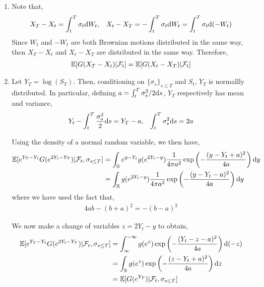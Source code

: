 \begin{solution}[Solution]
\begin{enumerate}[label=(\alph*)]
    \item Note that,
        \begin{align*}
            X_T - X_t = \int_t^T \sigma_t \mathrm{d} W_t
            , && 
            X_t - X_T = -\int_t^T \sigma_t \mathrm{d} W_t = \int_t^T \sigma_t \mathrm{d} (-W_t)
        \end{align*}
        Since \( W_t \) and \( -W_t \) are both Brownian motions distributed in the same way, then \( X_T-X_t \) and \( X_t - X_T \) are distributed in the same way. Therefore,
        \begin{align*}
            \mathbb{E}[G(X_T-X_t) | \mathcal{F}_t ] = \mathbb{E}[G(X_t-X_T) | \mathcal{F}_t]
        \end{align*}
        
    \item
        Let \( Y_T = \log(S_T) \). Then, conditioning on \( \{ \sigma_s\}_{s\leq T} \) and \( S_t \), \( Y_T \) is normallly distributed. In particular, defining \( a = \int_t^T \sigma_s^2/2\mathrm{d} s\), \( Y_T \) respectively has mean and variance,
        \begin{align*}
            Y_t - \int_t^T \frac{\sigma_s^2}{2}\mathrm{d} s = Y_T-a
            , &&
            \int_t^T\sigma_s^2\mathrm{d} s = 2 a
        \end{align*}
        
        Using the density of a normal random variable, we then have,
        \begin{align*}
            \mathbb{E}[e^{Y_T-Y_t} G(e^{2Y_t-Y_T}) | \mathcal{F}_t, \sigma_{s\leq T}]
            &=\int_{\mathbb{R}} e^{y-Y_t} g(e^{2Y_t-y}) \frac{1}{4\pi a^2} \exp\left( - \frac{(y-Y_t+a)^2}{4a}\right)\mathrm{d} y
            \\&=\int_{\mathbb{R}} g(e^{2Y_t-y}) \frac{1}{4\pi a^2} \exp\left( - \frac{(y-Y_t-a)^2}{4a}\right)\mathrm{d} y
        \end{align*}
        where we have used the fact that,
        \begin{align*}
            4a b - (b+a)^2 = -(b-a)^2
        \end{align*}
       
        We now make a change of variables \( z = 2Y_t-y \) to obtain,
        \begin{align*}
            \mathbb{E}[e^{Y_T-Y_t} G(e^{2Y_t-Y_T}) | \mathcal{F}_t,\sigma_{s\leq T}]
            &=\int_\infty^{-\infty} g(e^z) \exp \left( -\frac{(Y_t-z-a)^2}{4a} \right) \mathrm{d}(-z)
            \\&= \int_{\mathbb{R}} g(e^z) \exp \left( -\frac{(z-Y_t+a)^2}{4a} \right) \mathrm{d} z
            \\&=\mathbb{E}[ G(e^{Y_T}) | \mathcal{F}_t, \sigma_{s\leq T}]
        \end{align*}
        

\end{enumerate}
\end{solution}
